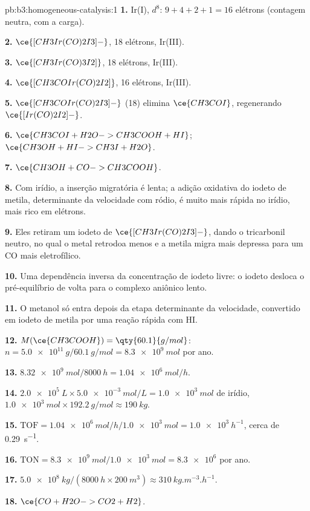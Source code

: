 \begin{solution}{pb:b3:homogeneous-catalysis:1}
\textbf{1.} Ir(I), $d^8$: $9 + 4 + 2 + 1 = 16$ elétrons (contagem neutra, com a carga).

\textbf{2.} $\ce{[CH3Ir(CO)2I3]-}$, 18 elétrons, Ir(III).

\textbf{3.} $\ce{[CH3Ir(CO)3I2]}$, 18 elétrons, Ir(III).

\textbf{4.} $\ce{[CH3COIr(CO)2I2]}$, 16 elétrons, Ir(III).

\textbf{5.} $\ce{[CH3COIr(CO)2I3]-}$ (18) elimina $\ce{CH3COI}$, regenerando $\ce{[Ir(CO)2I2]-}$.

\textbf{6.} $\ce{CH3COI + H2O -> CH3COOH + HI}$; $\ce{CH3OH + HI -> CH3I + H2O}$.

\textbf{7.} $\ce{CH3OH + CO -> CH3COOH}$.

\textbf{8.} Com irídio, a inserção migratória é lenta; a adição oxidativa do
iodeto de metila, determinante da velocidade com ródio, é muito mais rápida no irídio, mais
rico em elétrons.

\textbf{9.} Eles retiram um iodeto de $\ce{[CH3Ir(CO)2I3]-}$, dando o tricarbonil neutro, no qual
o metal retrodoa menos e a metila migra mais depressa para um CO mais
eletrofílico.

\textbf{10.} Uma dependência inversa da concentração de iodeto livre: o iodeto desloca
o pré-equilíbrio de volta para o complexo aniônico lento.

\textbf{11.} O metanol só entra depois da etapa determinante da velocidade, convertido em
iodeto de metila por uma reação rápida com HI.

\textbf{12.} $M(\ce{CH3COOH}) = \qty{60.1}{g/mol}$: $n = \qty{5.0e11}{g}/\qty{60.1}{g/mol} = \qty{8.3e9}{mol}$ por ano.

\textbf{13.} $\qty{8.32e9}{mol}/\qty{8000}{h} = \qty{1.04e6}{mol/h}$.

\textbf{14.} $\qty{2.0e5}{L} \times \qty{5.0e-3}{mol/L} = \qty{1.0e3}{mol}$ de irídio, $\qty{1.0e3}{mol} \times \qty{192.2}{g/mol} \approx \qty{190}{kg}$.

\textbf{15.} $\mathrm{TOF} = \qty{1.04e6}{mol/h}/\qty{1.0e3}{mol} = \qty{1.0e3}{h^{-1}}$, cerca de \qty{0.29}{s^{-1}}.

\textbf{16.} $\mathrm{TON} = \qty{8.3e9}{mol}/\qty{1.0e3}{mol} = \num{8.3e6}$ por ano.

\textbf{17.} $\qty{5.0e8}{kg}/(\qty{8000}{h} \times \qty{200}{m^3}) \approx \qty{310}{kg.m^{-3}.h^{-1}}$.

\textbf{18.} $\ce{CO + H2O -> CO2 + H2}$.


\end{solution}
